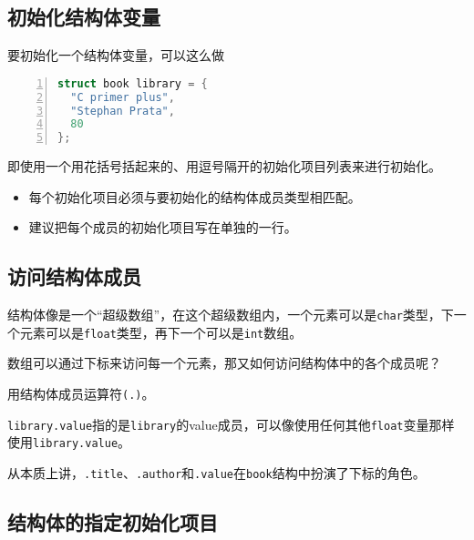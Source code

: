 \subsection{初始化结构体变量}

\begin{frame}[fragile]
要初始化一个结构体变量，可以这么做
\begin{lstlisting}[language=c,numbers=left,frame=single]
struct book library = {
  "C primer plus",
  "Stephan Prata",
  80
};  
\end{lstlisting}
即使用一个用花括号括起来的、用逗号隔开的初始化项目列表来进行初始化。
\begin{itemize}
\item 每个初始化项目必须与要初始化的结构体成员类型相匹配。
\item 建议把每个成员的初始化项目写在单独的一行。
\end{itemize}
\end{frame}

\subsection{访问结构体成员}

\begin{frame}[fragile]
  结构体像是一个“超级数组”，在这个超级数组内，一个元素可以是\verb|char|类型，下一个元素可以是\verb|float|类型，再下一个可以是\verb|int|数组。\vspace{0.1in}

  数组可以通过下标来访问每一个元素，那又如何访问结构体中的各个成员呢？ \pause \vspace{0.1in}

 {\Large 用结构体成员运算符\verb|(.)|}。\vspace{0.1in}

  \verb|library.value|指的是\verb|library|的value成员，可以像使用任何其他\verb|float|变量那样使用\verb|library.value|。\vspace{0.1in}

从本质上讲，\verb|.title|、\verb|.author|和\verb|.value|在\verb|book|结构中扮演了下标的角色。
\end{frame}

\subsection{结构体的指定初始化项目}

